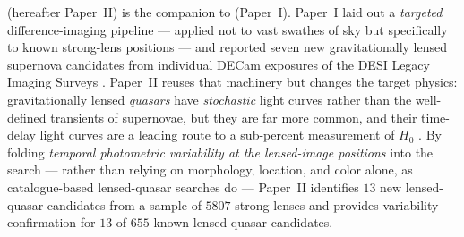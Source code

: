 \documentclass[11pt,letterpaper]{article}
\begin{document}
\citet{sheu2024variable} (hereafter Paper~II) is the companion to
\citet{sheu2023lensedsne} (Paper~I). Paper~I laid out a \emph{targeted}
difference-imaging pipeline --- applied not to vast swathes of sky but
specifically to known strong-lens positions --- and reported seven new
gravitationally lensed supernova candidates from individual DECam exposures of
the DESI Legacy Imaging Surveys \autocite{dey2019legacy}. Paper~II reuses that
machinery but changes the target physics: gravitationally lensed \emph{quasars}
have \emph{stochastic} light curves rather than the well-defined transients of
supernovae, but they are far more common, and their time-delay light curves are
a leading route to a sub-percent measurement of $H_0$
\autocite{wong2019h0licow}. By folding \emph{temporal photometric variability
at the lensed-image positions} into the search --- rather than relying on
morphology, location, and color alone, as catalogue-based lensed-quasar searches
do \autocite{dawes2023qso,he2023qso} --- Paper~II identifies $13$ new lensed-quasar
candidates from a sample of $5807$ strong lenses and provides variability
confirmation for $13$ of $655$ known lensed-quasar candidates.
\end{document}
